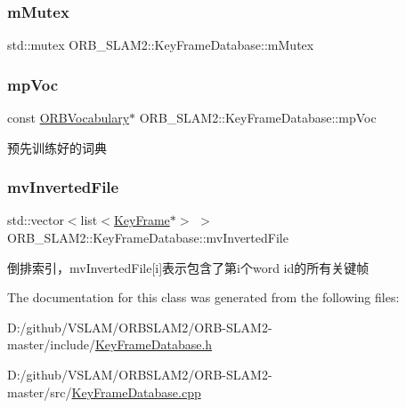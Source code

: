\subsubsection{\texorpdfstring{m\+Mutex}{mMutex}}
{\footnotesize\ttfamily std\+::mutex O\+R\+B\+\_\+\+S\+L\+A\+M2\+::\+Key\+Frame\+Database\+::m\+Mutex\hspace{0.3cm}{\ttfamily [protected]}}

\mbox{\label{class_o_r_b___s_l_a_m2_1_1_key_frame_database_ad11a653313a5f0ef6f6fbc4880df0b7d}} 
\subsubsection{\texorpdfstring{mp\+Voc}{mpVoc}}
{\footnotesize\ttfamily const \mbox{\hyperlink{namespace_o_r_b___s_l_a_m2_a2fafba714858cab1bb18d438e2e83c5d}{O\+R\+B\+Vocabulary}}$\ast$ O\+R\+B\+\_\+\+S\+L\+A\+M2\+::\+Key\+Frame\+Database\+::mp\+Voc\hspace{0.3cm}{\ttfamily [protected]}}



预先训练好的词典 

\mbox{\label{class_o_r_b___s_l_a_m2_1_1_key_frame_database_a3b6d73823fcd1b96f3ba5a66be0b2227}} 
\subsubsection{\texorpdfstring{mv\+Inverted\+File}{mvInvertedFile}}
{\footnotesize\ttfamily std\+::vector$<$list$<$\mbox{\hyperlink{class_o_r_b___s_l_a_m2_1_1_key_frame}{Key\+Frame}}$\ast$$>$ $>$ O\+R\+B\+\_\+\+S\+L\+A\+M2\+::\+Key\+Frame\+Database\+::mv\+Inverted\+File\hspace{0.3cm}{\ttfamily [protected]}}



倒排索引，mv\+Inverted\+File\mbox{[}i\mbox{]}表示包含了第i个word id的所有关键帧 



The documentation for this class was generated from the following files\+:\begin{DoxyCompactItemize}
\item 
D\+:/github/\+V\+S\+L\+A\+M/\+O\+R\+B\+S\+L\+A\+M2/\+O\+R\+B-\/\+S\+L\+A\+M2-\/master/include/\mbox{\hyperlink{_key_frame_database_8h}{Key\+Frame\+Database.\+h}}\item 
D\+:/github/\+V\+S\+L\+A\+M/\+O\+R\+B\+S\+L\+A\+M2/\+O\+R\+B-\/\+S\+L\+A\+M2-\/master/src/\mbox{\hyperlink{_key_frame_database_8cpp}{Key\+Frame\+Database.\+cpp}}\end{DoxyCompactItemize}
